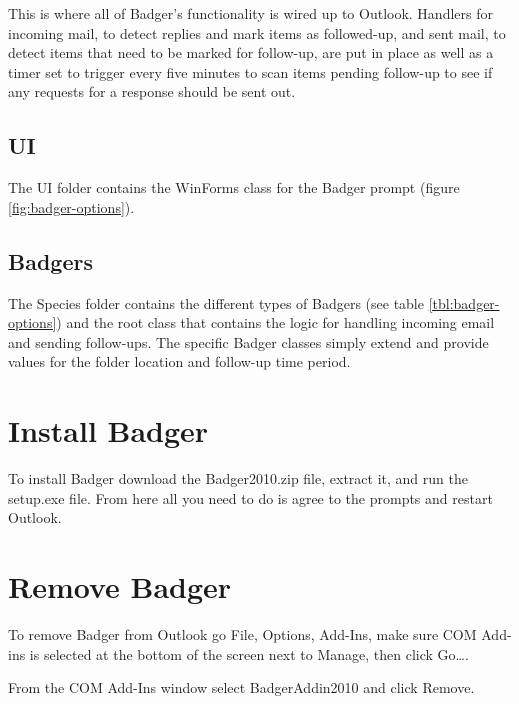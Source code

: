 \documentclass[12pt]{article}
\begin{document}
This is where all of Badger's functionality is wired up to Outlook.  Handlers for incoming mail, to detect replies and mark items as followed-up, and sent mail, to detect items that need to be marked for follow-up, are put in place as well as a timer set to trigger every five minutes to scan items pending follow-up to see if any requests for a response should be sent out.

\subsection{UI}

The UI folder contains the WinForms class for the Badger prompt (figure \ref{fig:badger-options}).

\subsection{Badgers}

The Species folder contains the different types of Badgers (see table \ref{tbl:badger-options}) and the root class that contains the logic for handling incoming email and sending follow-ups. The specific Badger classes simply extend and provide values for the folder location and follow-up time period.

\section{Install Badger}

To install Badger download the Badger2010.zip file, extract it, and run the setup.exe file. From here all you need to do is agree to the prompts and restart Outlook.

\section{Remove Badger}

To remove Badger from Outlook go File, Options, Add-Ins, make sure COM Add-ins is selected at the bottom of the screen next to Manage, then click Go\dots .

From the COM Add-Ins window select BadgerAddin2010 and click Remove.
\end{document}
